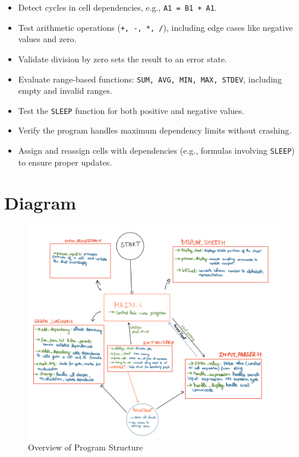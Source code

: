\documentclass[12pt]{article}
\begin{document}
\begin{itemize}
    \item Detect cycles in cell dependencies, e.g., \texttt{A1 = B1 + A1}.
    \item Test arithmetic operations (\texttt{+, -, *, /}), including edge cases like negative values and zero.
    \item Validate division by zero sets the result to an error state.
    \item Evaluate range-based functions: \texttt{SUM, AVG, MIN, MAX, STDEV}, including empty and invalid ranges.
    \item Test the \texttt{SLEEP} function for both positive and negative values.
    \item Verify the program handles maximum dependency limits without crashing.
    \item Assign and reassign cells with dependencies (e.g., formulas involving \texttt{SLEEP}) to ensure proper updates.
\end{itemize}


\newpage

\section*{Diagram}
\begin{figure}[h!]
    \centering
    \includegraphics[width=\textwidth]{diagram.png}
    \caption{Overview of Program Structure}
\end{figure}
\end{document}
